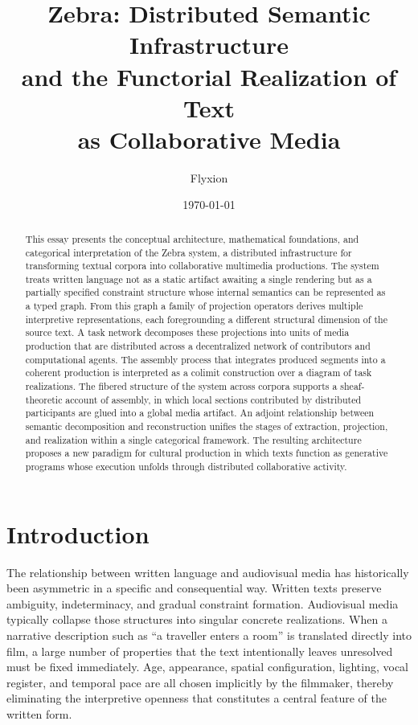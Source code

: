 \documentclass[12pt,a4paper]{article}
\title{\textbf{Zebra: Distributed Semantic Infrastructure\\and the Functorial Realization of Text\\as Collaborative Media}}
\author{Flyxion}
\date{\today}
\begin{document}
\maketitle
\thispagestyle{empty}

\begin{abstract}
\noindent
This essay presents the conceptual architecture, mathematical foundations, and categorical interpretation of the Zebra system, a distributed infrastructure for transforming textual corpora into collaborative multimedia productions. The system treats written language not as a static artifact awaiting a single rendering but as a partially specified constraint structure whose internal semantics can be represented as a typed graph. From this graph a family of projection operators derives multiple interpretive representations, each foregrounding a different structural dimension of the source text. A task network decomposes these projections into units of media production that are distributed across a decentralized network of contributors and computational agents. The assembly process that integrates produced segments into a coherent production is interpreted as a colimit construction over a diagram of task realizations. The fibered structure of the system across corpora supports a sheaf-theoretic account of assembly, in which local sections contributed by distributed participants are glued into a global media artifact. An adjoint relationship between semantic decomposition and reconstruction unifies the stages of extraction, projection, and realization within a single categorical framework. The resulting architecture proposes a new paradigm for cultural production in which texts function as generative programs whose execution unfolds through distributed collaborative activity.
\end{abstract}

\newpage
\tableofcontents
\newpage

\section{Introduction}

The relationship between written language and audiovisual media has historically been asymmetric in a specific and consequential way. Written texts preserve ambiguity, indeterminacy, and gradual constraint formation. Audiovisual media typically collapse those structures into singular concrete realizations. When a narrative description such as \enquote{a traveller enters a room} is translated directly into film, a large number of properties that the text intentionally leaves unresolved must be fixed immediately. Age, appearance, spatial configuration, lighting, vocal register, and temporal pace are all chosen implicitly by the filmmaker, thereby eliminating the interpretive openness that constitutes a central feature of the written form.
\end{document}
